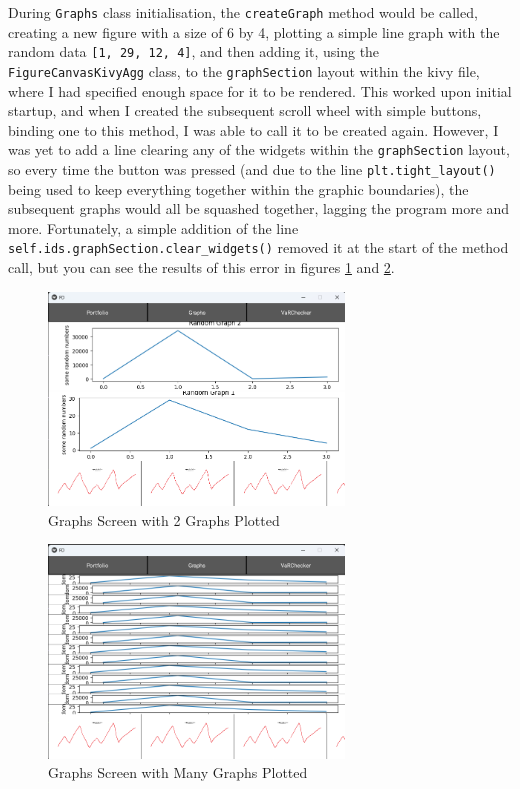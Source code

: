\documentclass{article}
\begin{document}
\vspace{0.3cm}
During \texttt{Graphs} class initialisation, the \texttt{createGraph} method would be called, creating a new figure with a size of 6 by 4, plotting a simple line graph with the random data \texttt{[1, 29, 12, 4]}, and then adding it, using the \texttt{FigureCanvasKivyAgg} class, to the \texttt{graphSection} layout within the kivy file, where I had specified enough space for it to be rendered. This worked upon initial startup, and when I created the subsequent scroll wheel with simple buttons, binding one to this method, I was able to call it to be created again. However, I was yet to add a line clearing any of the widgets within the \texttt{graphSection} layout, so every time the button was pressed (and due to the line \texttt{plt.tight\_layout()} being used to keep everything together within the graphic boundaries), the subsequent graphs would all be squashed together, lagging the program more and more. Fortunately, a simple addition of the line \texttt{self.ids.graphSection.clear\_widgets()} removed it at the start of the method call, but you can see the results of this error in figures \ref{fig:Graphs Screen Error} and \ref{fig:Graphs Screen Error 2}.\\\vspace{0.3cm}

\begin{figure}[h]
  \centering
  \includegraphics[width=0.7\textwidth]{Images/Term 2 Images/image (7).png}
  \caption{Graphs Screen with 2 Graphs Plotted}
  \label{fig:Graphs Screen Error}
\end{figure}

\begin{figure}[H]
  \centering
  \includegraphics[width=0.7\textwidth]{Images/Term 2 Images/image (5).png}
  \caption{Graphs Screen with Many Graphs Plotted}
  \label{fig:Graphs Screen Error 2}
\end{figure}
\end{document}
